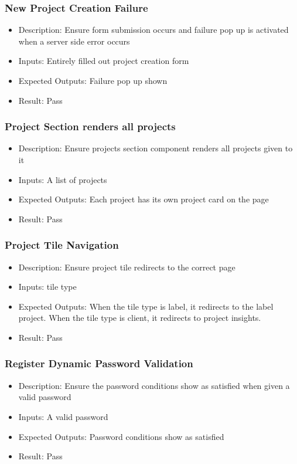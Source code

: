 \documentclass[12pt, titlepage]{article}
\begin{document}
\subsubsection{New Project Creation Failure}
\begin{itemize}
    \item Description: Ensure form submission occurs and failure pop up is activated when a server side error occurs
    \item Inputs: Entirely filled out project creation form
    \item Expected Outputs: Failure pop up shown
    \item Result: Pass
\end{itemize}
\subsubsection{Project Section renders all projects}
\begin{itemize}
    \item Description: Ensure projects section component renders all projects given to it
    \item Inputs: A list of projects
    \item Expected Outputs: Each project has its own project card on the page
    \item Result: Pass
\end{itemize}
\subsubsection{Project Tile Navigation}
\begin{itemize}
    \item Description: Ensure project tile redirects to the correct page
    \item Inputs: tile type
    \item Expected Outputs: When the tile type is label, it redirects to the label project. When the tile type is client, it redirects to project insights.
    \item Result: Pass
\end{itemize}
\subsubsection{Register Dynamic Password Validation}
\begin{itemize}
    \item Description: Ensure the password conditions show as satisfied when given a valid password
    \item Inputs: A valid password
    \item Expected Outputs: Password conditions show as satisfied
    \item Result: Pass
\end{itemize}
\end{document}
